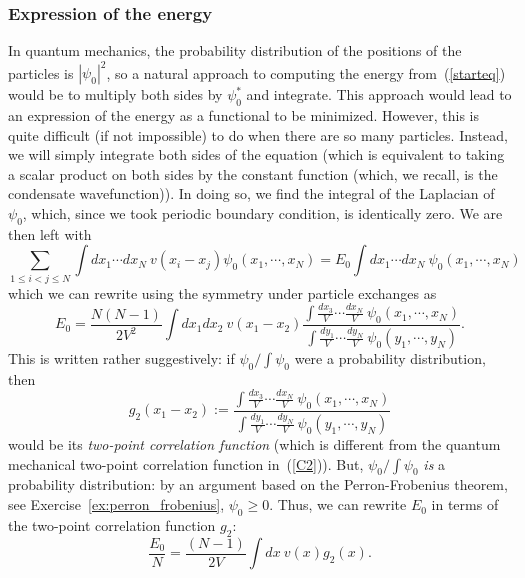 \documentclass{ian}
\begin{document}
\subsubsection{Expression of the energy}
In quantum mechanics, the probability distribution of the positions of the particles is $|\psi_0|^2$, so a natural approach to computing the energy from\-~(\ref{starteq}) would be to multiply both sides by $\psi_0^*$ and integrate.
This approach would lead to an expression of the energy as a functional to be minimized.
However, this is quite difficult (if not impossible) to do when there are so many particles.
Instead, we will simply integrate both sides of the equation (which is equivalent to taking a scalar product on both sides by the constant function (which, we recall, is the condensate wavefunction)).
In doing so, we find the integral of the Laplacian of $\psi_0$, which, since we took periodic boundary condition, is identically zero.
We are then left with
\begin{equation}
  \sum_{1\leqslant i<j\leqslant N}\int dx_1\cdots dx_N\ v(x_i-x_j)\psi_0(x_1,\cdots,x_N)=E_0\int dx_1\cdots dx_N\ \psi_0(x_1,\cdots,x_N)
\end{equation}
which we can rewrite using the symmetry under particle exchanges as
\begin{equation}
  E_0=\frac{N(N-1)}{2V^2}\int dx_1dx_2\ v(x_1-x_2)
  \frac{\int\frac{dx_3}V\cdots\frac{dx_N}V\ \psi_0(x_1,\cdots,x_N)}{\int\frac{dy_1}V\cdots\frac{dy_N}V\ \psi_0(y_1,\cdots,y_N)}
  .
\end{equation}
This is written rather suggestively: if $\psi_0/\int\psi_0$ were a probability distribution, then
\begin{equation}
  g_2(x_1-x_2):=\frac{\int\frac{dx_3}V\cdots\frac{dx_N}V\ \psi_0(x_1,\cdots,x_N)}{\int\frac{dy_1}V\cdots\frac{dy_N}V\ \psi_0(y_1,\cdots,y_N)}
\end{equation}
would be its {\it two-point correlation function} (which is different from the quantum mechanical two-point correlation function in\-~(\ref{C2})).
But, $\psi_0/\int\psi_0$ {\it is} a probability distribution: by an argument based on the Perron-Frobenius theorem, see Exercise\-~\ref{ex:perron_frobenius}, $\psi_0\geqslant 0$.
Thus, we can rewrite $E_0$ in terms of the two-point correlation function $g_2$:
\begin{equation}
  \frac{E_0}N=\frac{(N-1)}{2V}\int dx\ v(x)g_2(x)
  .
  \label{E0}
\end{equation}
\end{document}
